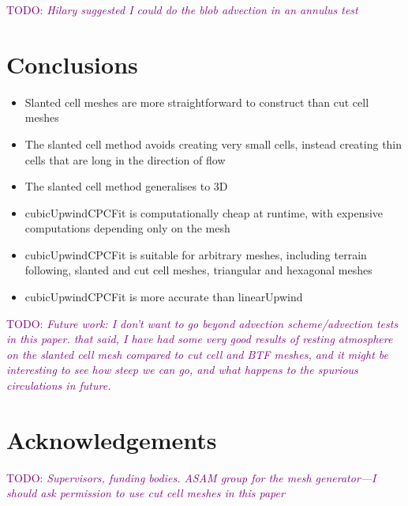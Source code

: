 \documentclass{article}
\newcommand{\TODO}[1]{\textcolor{purple}{TODO: \emph{#1}}}
\begin{document}
\TODO{Hilary suggested I could do the blob advection in an annulus test \citep{berger-helzel2012}}

\section{Conclusions}

\begin{itemize}
	\item Slanted cell meshes are more straightforward to construct than cut cell meshes
	\item The slanted cell method avoids creating very small cells, instead creating thin cells that are long in the direction of flow
	\item The slanted cell method generalises to 3D
	\item cubicUpwindCPCFit is computationally cheap at runtime, with expensive computations depending only on the mesh
	\item cubicUpwindCPCFit is suitable for arbitrary meshes, including terrain following, slanted and cut cell meshes, triangular and hexagonal meshes
	\item cubicUpwindCPCFit is more accurate than linearUpwind
\end{itemize}

\TODO{Future work: I don't want to go beyond advection scheme/advection tests in this paper.  that said, I have had some very good results of resting atmosphere on the slanted cell mesh compared to cut cell and BTF meshes, and it might be interesting to see how steep we can go, and what happens to the spurious circulations in future.}

\section{Acknowledgements}
\TODO{Supervisors, funding bodies.  ASAM group for the mesh generator---I should ask permission to use cut cell meshes in this paper}



\end{document}
